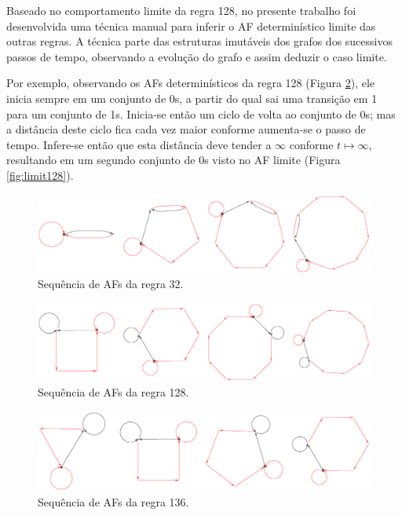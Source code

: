 \documentclass[12pt,a4paper]{article}
\begin{document}
Baseado no comportamento limite da regra 128, no presente trabalho foi
desenvolvida uma técnica manual para inferir o AF determinístico limite
das outras regras.  A técnica parte das estruturas imutáveis dos grafos
dos sucessivos passos de tempo, observando a evolução do grafo e assim
deduzir o caso limite.

Por exemplo, observando os AFs determinísticos da regra 128 (Figura \ref{fig:r128ta}), ele
inicia sempre em um conjunto de 0s, a partir do qual sai uma transição em 1 para um
conjunto de 1s. Inicia-se então um ciclo de volta ao conjunto de 0s; mas a
distância deste ciclo fica cada vez maior conforme aumenta-se o passo de
tempo. Infere-se então que esta distância deve tender a $\infty$ conforme
$t \mapsto \infty$, resultando em um segundo conjunto de 0s visto no AF
limite (Figura \ref{fig:limit128}).

\begin{figure}[H]
\begin{center}
\includegraphics[scale=0.60]{img/Rule32dfa.eps}
\caption{Sequência de AFs da regra 32.}
\label{fig:r32ta}
\end{center}
\end{figure}

\begin{figure}[H]
\begin{center}
\includegraphics[scale=0.60]{img/Rule128dfa.eps}
\caption{Sequência de AFs da regra 128.}
\label{fig:r128ta}
\end{center}
\end{figure}

\begin{figure}[H]
\begin{center}
\includegraphics[scale=0.55]{img/Rule136dfa.eps}
\caption{Sequência de AFs da regra 136.}
\label{fig:r136ta}
\end{center}
\end{figure}
\end{document}
